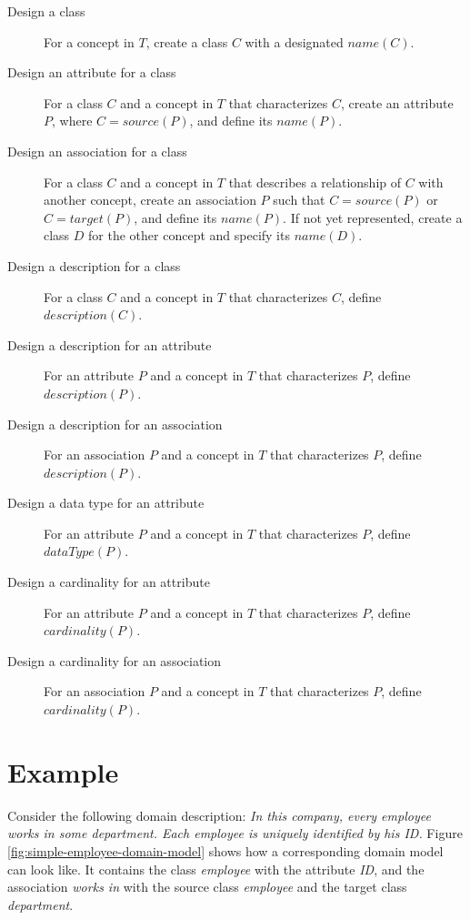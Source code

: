 \begin{description}
\item [Design a class] For a concept in $T$, create a class $C$ with a designated $name(C)$.

\item[Design an attribute for a class] For a class $C$ and a concept in $T$ that characterizes $C$, create an attribute $P$, where $C = source(P)$, and define its $name(P)$.

\item[Design an association for a class] For a class $C$ and a concept in $T$ that describes a relationship of $C$ with another concept, create an association $P$ such that $C = source(P)$ or $C = target(P)$, and define its $name(P)$. If not yet represented, create a class $D$ for the other concept and specify its $name(D)$.

\item [Design a description for a class] For a class $C$ and a concept in $T$ that characterizes $C$, define $description(C)$.

\item [Design a description for an attribute] For an attribute $P$ and a concept in $T$ that characterizes $P$, define $description(P)$.

\item [Design a description for an association] For an association $P$ and a concept in $T$ that characterizes $P$, define $description(P)$.

\item [Design a data type for an attribute] For an attribute $P$ and a concept in $T$ that characterizes $P$, define $dataType(P)$.

\item [Design a cardinality for an attribute] For an attribute $P$ and a concept in $T$ that characterizes $P$, define $cardinality(P)$.

\item [Design a cardinality for an association] For an association $P$ and a concept in $T$ that characterizes $P$, define $cardinality(P)$.
\end{description}


\section{Example}
\label{sec:simple_domain_description_example}

Consider the following domain description: \textit{In this company, every employee works in some department. Each employee is uniquely identified by his ID.} Figure \ref{fig:simple-employee-domain-model} shows how a corresponding domain model can look like. It contains the class \textit{employee} with the attribute \textit{ID}, and the association \textit{works in} with the source class \textit{employee} and the target class \textit{department}.

